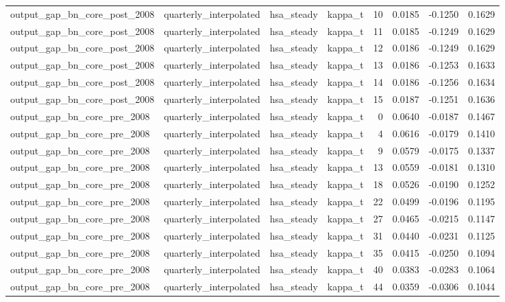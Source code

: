 \begin{tabular}{llllrrrr}
output\_gap\_bn\_core\_post\_2008 & quarterly\_interpolated & hsa\_steady & kappa\_t & 10 & 0.0185 & -0.1250 & 0.1629 \\
output\_gap\_bn\_core\_post\_2008 & quarterly\_interpolated & hsa\_steady & kappa\_t & 11 & 0.0185 & -0.1249 & 0.1629 \\
output\_gap\_bn\_core\_post\_2008 & quarterly\_interpolated & hsa\_steady & kappa\_t & 12 & 0.0186 & -0.1249 & 0.1629 \\
output\_gap\_bn\_core\_post\_2008 & quarterly\_interpolated & hsa\_steady & kappa\_t & 13 & 0.0186 & -0.1253 & 0.1633 \\
output\_gap\_bn\_core\_post\_2008 & quarterly\_interpolated & hsa\_steady & kappa\_t & 14 & 0.0186 & -0.1256 & 0.1634 \\
output\_gap\_bn\_core\_post\_2008 & quarterly\_interpolated & hsa\_steady & kappa\_t & 15 & 0.0187 & -0.1251 & 0.1636 \\
output\_gap\_bn\_core\_pre\_2008 & quarterly\_interpolated & hsa\_steady & kappa\_t & 0 & 0.0640 & -0.0187 & 0.1467 \\
output\_gap\_bn\_core\_pre\_2008 & quarterly\_interpolated & hsa\_steady & kappa\_t & 4 & 0.0616 & -0.0179 & 0.1410 \\
output\_gap\_bn\_core\_pre\_2008 & quarterly\_interpolated & hsa\_steady & kappa\_t & 9 & 0.0579 & -0.0175 & 0.1337 \\
output\_gap\_bn\_core\_pre\_2008 & quarterly\_interpolated & hsa\_steady & kappa\_t & 13 & 0.0559 & -0.0181 & 0.1310 \\
output\_gap\_bn\_core\_pre\_2008 & quarterly\_interpolated & hsa\_steady & kappa\_t & 18 & 0.0526 & -0.0190 & 0.1252 \\
output\_gap\_bn\_core\_pre\_2008 & quarterly\_interpolated & hsa\_steady & kappa\_t & 22 & 0.0499 & -0.0196 & 0.1195 \\
output\_gap\_bn\_core\_pre\_2008 & quarterly\_interpolated & hsa\_steady & kappa\_t & 27 & 0.0465 & -0.0215 & 0.1147 \\
output\_gap\_bn\_core\_pre\_2008 & quarterly\_interpolated & hsa\_steady & kappa\_t & 31 & 0.0440 & -0.0231 & 0.1125 \\
output\_gap\_bn\_core\_pre\_2008 & quarterly\_interpolated & hsa\_steady & kappa\_t & 35 & 0.0415 & -0.0250 & 0.1094 \\
output\_gap\_bn\_core\_pre\_2008 & quarterly\_interpolated & hsa\_steady & kappa\_t & 40 & 0.0383 & -0.0283 & 0.1064 \\
output\_gap\_bn\_core\_pre\_2008 & quarterly\_interpolated & hsa\_steady & kappa\_t & 44 & 0.0359 & -0.0306 & 0.1044 \\

\end{tabular}
